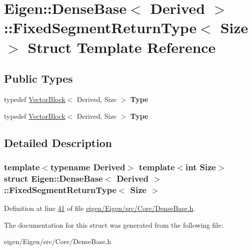 \hypertarget{struct_eigen_1_1_dense_base_1_1_fixed_segment_return_type}{}\section{Eigen\+:\+:Dense\+Base$<$ Derived $>$\+:\+:Fixed\+Segment\+Return\+Type$<$ Size $>$ Struct Template Reference}
\label{struct_eigen_1_1_dense_base_1_1_fixed_segment_return_type}
\subsection*{Public Types}
\begin{DoxyCompactItemize}
\item 
\mbox{\label{struct_eigen_1_1_dense_base_1_1_fixed_segment_return_type_a611340fa5fd606f4b8ce34fad58012e5}} 
typedef \hyperlink{group___core___module_class_eigen_1_1_vector_block}{Vector\+Block}$<$ Derived, Size $>$ {\bfseries Type}
\item 
\mbox{\label{struct_eigen_1_1_dense_base_1_1_fixed_segment_return_type_a611340fa5fd606f4b8ce34fad58012e5}} 
typedef \hyperlink{group___core___module_class_eigen_1_1_vector_block}{Vector\+Block}$<$ Derived, Size $>$ {\bfseries Type}
\end{DoxyCompactItemize}


\subsection{Detailed Description}
\subsubsection*{template$<$typename Derived$>$\newline
template$<$int Size$>$\newline
struct Eigen\+::\+Dense\+Base$<$ Derived $>$\+::\+Fixed\+Segment\+Return\+Type$<$ Size $>$}



Definition at line \hyperlink{eigen_2_eigen_2src_2_core_2_dense_base_8h_source_l00041}{41} of file \hyperlink{eigen_2_eigen_2src_2_core_2_dense_base_8h_source}{eigen/\+Eigen/src/\+Core/\+Dense\+Base.\+h}.



The documentation for this struct was generated from the following file\+:\begin{DoxyCompactItemize}
\item 
eigen/\+Eigen/src/\+Core/\+Dense\+Base.\+h\end{DoxyCompactItemize}
